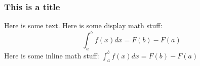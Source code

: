 \documentclass{beamer}
\begin{document}
\begin{frame}
\frametitle{This is a title}

Here is some text.
Here is some display math stuff:
\[ \int_a^b f(x) dx = F(b)-F(a) \]
Here is some inline math stuff: $\int_a^b f(x) dx = F(b)-F(a)$
\end{frame}
\end{document}
